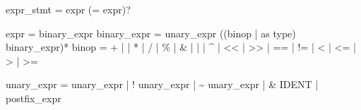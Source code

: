 \documentclass[
  11pt,
  a4paper,
]{report}
\newenvironment{Shaded}{\begin{snugshade}\small}{\end{snugshade}}
\newcommand{\NormalTok}[1]{#1}
\begin{document}
\begin{Shaded}
\begin{Highlighting}[]
\NormalTok{expr\_stmt      = expr (\textquotesingle{}=\textquotesingle{} expr)?}

\NormalTok{expr           = binary\_expr}
\NormalTok{binary\_expr    = unary\_expr ((binop | \textquotesingle{}as\textquotesingle{} type) binary\_expr)*}
\NormalTok{binop          = \textquotesingle{}+\textquotesingle{} | \textquotesingle{}{-}\textquotesingle{} | \textquotesingle{}*\textquotesingle{} | \textquotesingle{}/\textquotesingle{} | \textquotesingle{}\%\textquotesingle{} | \textquotesingle{}\&\textquotesingle{} | \textquotesingle{}|\textquotesingle{} | \textquotesingle{}\^{}\textquotesingle{}}
\NormalTok{               | \textquotesingle{}\textless{}\textless{}\textquotesingle{} | \textquotesingle{}\textgreater{}\textgreater{}\textquotesingle{} | \textquotesingle{}==\textquotesingle{} | \textquotesingle{}!=\textquotesingle{} | \textquotesingle{}\textless{}\textquotesingle{} | \textquotesingle{}\textless{}=\textquotesingle{} | \textquotesingle{}\textgreater{}\textquotesingle{} | \textquotesingle{}\textgreater{}=\textquotesingle{}}

\NormalTok{unary\_expr     = \textquotesingle{}{-}\textquotesingle{} unary\_expr | \textquotesingle{}!\textquotesingle{} unary\_expr | \textquotesingle{}\textasciitilde{}\textquotesingle{} unary\_expr}
\NormalTok{               | \textquotesingle{}\&\textquotesingle{} IDENT | postfix\_expr}


\end{Highlighting}
\end{Shaded}
\end{document}
